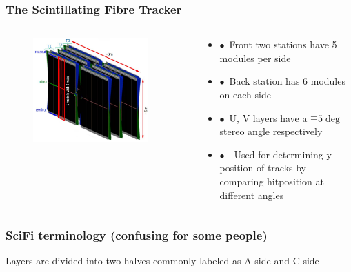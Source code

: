 \documentclass[aspectratio=1610, 12pt, xcolor=dvipsnames]{beamer}
\begin{document}
\begin{frame}\frametitle{The Scintillating Fibre Tracker}
  \begin{columns}
    \begin{column}[c]{0.48\textwidth}
      \begin{figure}
        \includegraphics[width=0.9\textwidth]{logos/scifi.png}
      \end{figure}
    \end{column}
    \begin{column}{0.48\textwidth}
      \begin{itemize}
        \item $\bullet$\, Front two stations have 5 modules per side
        \item $\bullet$\, Back station has 6 modules on each side
        \item $\bullet$\, U, V layers have a $\mp 5 \deg$ stereo angle respectively
        \item $\bullet$\, \to\, Used for determining y-position of tracks by comparing hitposition at different angles
      \end{itemize}
    \end{column}
  \end{columns}
\end{frame}

\begin{frame}\frametitle{SciFi terminology (confusing for some people)}
  Layers are divided into two halves commonly labeled as A-side and C-side
  
\end{frame}
\end{document}
